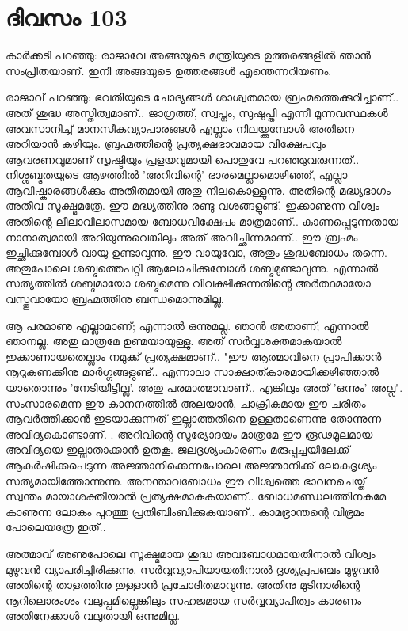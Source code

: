\newpage
\section{ദിവസം 103}


കാര്‍ക്കടി പറഞ്ഞു: രാജാവേ അങ്ങയുടെ മന്ത്രിയുടെ ഉത്തരങ്ങളില്‍ ഞാന്‍ സംപ്രീതയാണ്‌. ഇനി അങ്ങയുടെ ഉത്തരങ്ങള്‍ എന്തെന്നറിയണം. 

രാജാവ്‌ പറഞ്ഞു: ഭവതിയുടെ ചോദ്യങ്ങള്‍ ശാശ്വതമായ ബ്രഹ്മത്തെക്കുറിച്ചാണ്‌.. അത്‌ ശുദ്ധ അസ്തിത്വമാണ്‌.. ജാഗ്രത്ത്‌, സ്വപ്നം, സുഷുപ്തി എന്നീ മൂന്നവസ്ഥകള്‍ അവസാനിച്ച്‌ മാനസീകവ്യാപാരങ്ങള്‍ എല്ലാം നിലയ്ക്കുമ്പോള്‍ അതിനെ അറിയാന്‍ കഴിയും. ബ്രഹ്മത്തിന്റെ പ്രത്യക്ഷഭാവമായ വിക്ഷേപവും ആവരണവുമാണ്‌ സൃഷ്ടിയും പ്രളയവുമായി പൊതുവേ പറഞ്ഞുവരുന്നത്‌.. നിശ്ശബ്ദതയുടെ ആഴത്തില്‍ 'അറിവിന്റെ' ഭാരമെല്ലാമൊഴിഞ്ഞ്‌, എല്ലാ ആവിഷ്കാരങ്ങള്‍ക്കും അതീതമായി അതു നിലകൊള്ളുന്നു. അതിന്റെ മദ്ധ്യഭാഗം അതീവ സൂക്ഷ്മമത്രേ. ഈ മദ്ധ്യത്തിനു രണ്ടു വശങ്ങളുണ്ട്‌.  ഇക്കാണുന്ന വിശ്വം അതിന്റെ ലീലാവിലാസമായ ബോധവിക്ഷേപം മാത്രമാണ്‌.. കാണപ്പെടുന്നതായ നാനാത്വമായി അറിയുന്നുവെങ്കിലും അത്‌ അവിച്ഛിന്നമാണ്‌.. ഈ ബ്രഹ്മം ഇച്ഛിക്കുമ്പോള്‍ വായു ഉണ്ടാവുന്നു. ഈ വായുവോ, അതും ശുദ്ധബോധം തന്നെ. അതുപോലെ ശബ്ദത്തെപറ്റി ആലോചിക്കുമ്പോള്‍ ശബ്ദമുണ്ടാവുന്നു. എന്നാല്‍ സത്യത്തില്‍ ശബ്ദമായോ ശബ്ദമെന്നു വിവക്ഷിക്കുന്നതിന്റെ അര്‍ത്ഥമായോ വസ്തുവായോ ബ്രഹ്മത്തിനു ബന്ധമൊന്നുമില്ല.

ആ പരമാണു എല്ലാമാണ്‌; എന്നാല്‍ ഒന്നുമല്ല. ഞാന്‍ അതാണ്‌; എന്നാല്‍ ഞാനല്ല. അതു മാത്രമേ ഉണ്മയായുള്ളു. അത്‌ സര്‍വ്വശക്തമാകയാല്‍ ഇക്കാണായതെല്ലാം നമുക്ക്‌ പ്രത്യക്ഷമാണ്‌.. "ഈ ആത്മാവിനെ പ്രാപിക്കാന്‍ നൂറുകണക്കിനു മാര്‍ഗ്ഗങ്ങളുണ്ട്‌.. എന്നാലാ സാക്ഷാത്കാരമായിക്കഴിഞ്ഞാല്‍ യാതൊന്നും 'നേടിയിട്ടില്ല'. അതു പരമാത്മാവാണ്‌.. എങ്കിലും അത്‌ 'ഒന്നും' അല്ല". സംസാരമെന്ന ഈ കാനനത്തില്‍ അലയാന്‍, ചാക്രികമായ ഈ ചരിതം ആവര്‍ത്തിക്കാന്‍ ഇടയാക്കുന്നത്‌ ഇല്ലാത്തതിനെ ഉള്ളതാണെന്നു തോന്നുന്ന അവിദ്യകൊണ്ടാണ്‌. . അറിവിന്റെ സൂര്യോദയം മാത്രമേ ഈ രൂഢമൂലമായ അവിദ്യയെ ഇല്ലാതാക്കാന്‍ ഉതകൂ. ജലദൃശ്യംകാരണം മരുപ്പച്ചയിലേക്ക്‌ ആകര്‍ഷിക്കപെടുന്ന അജ്ഞാനിക്കെന്നപോലെ അജ്ഞാനിക്ക്‌ ലോകദൃശ്യം സത്യമായിത്തോന്നുന്നു. അനന്താവബോധം ഈ വിശ്വത്തെ ഭാവനചെയ്ത്‌ സ്വന്തം മായാശക്തിയാല്‍ പ്രത്യക്ഷമാകുകയാണ്‌.. ബോധമണ്ഡലത്തിനകമേ കാണുന്ന ലോകം പുറത്തു പ്രതിബിംബിക്കുകയാണ്‌.. കാമഭ്രാന്തന്റെ വിഭ്രമം പോലെയത്രേ ഇത്‌..

അത്മാവ്‌ അണുപോലെ സൂക്ഷ്മമായ ശുദ്ധ അവബോധമായതിനാല്‍ വിശ്വം മുഴുവന്‍ വ്യാപരിച്ചിരിക്കുന്നു. സര്‍വ്വവ്യാപിയായതിനാല്‍ ദൃശ്യപ്രപഞ്ചം മുഴുവന്‍ അതിന്റെ താളത്തിനു തുള്ളാന്‍ പ്രചോദിതമാവുന്നു. അതിനു മുടിനാരിന്റെ നൂറിലൊരംശം വലുപ്പമില്ലെങ്കിലും സഹജമായ സര്‍വ്വവ്യാപിത്വം കാരണം അതിനേക്കാള്‍ വലുതായി ഒന്നുമില്ല.

